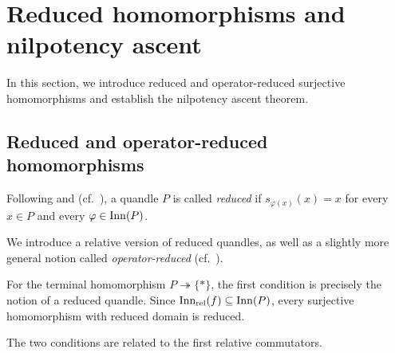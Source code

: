 \section{Reduced homomorphisms and nilpotency ascent}
\label{section: relative reduced homomorphisms}

In this section, we introduce reduced and operator-reduced surjective homomorphisms and establish the nilpotency ascent theorem.


\subsection{Reduced and operator-reduced homomorphisms}
\label{subsection: definition of relative reduced homomorphisms}

Following \cite[Definition 3.1]{inoue_2013_quasitriviality_of_quandles_for_linkhomotopy} and \cite[Definition 7.1]{darne_2026_nilpotent_quandles} (cf.~\cite[Definition 4.1]{hughes_2011_link_homotopy_invariant_quandles}), a quandle $P$ is called \emph{reduced} if $s_{\varphi(x)}(x)=x$ for every $x\in P$ and every $\varphi\in\operatorname{Inn}(P)$.

We introduce a relative version of reduced quandles, as well as a slightly more general notion called \emph{operator-reduced} (cf.~\cite[Section 5]{hughes_2011_link_homotopy_invariant_quandles}).


For the terminal homomorphism $P\twoheadrightarrow\{*\}$, the first condition is precisely the notion of a reduced quandle. Since $\operatorname{Inn_{rel}}(f)\subseteq\operatorname{Inn}(P)$, every surjective homomorphism with reduced domain is reduced.

The two conditions are related to the first relative commutators.

